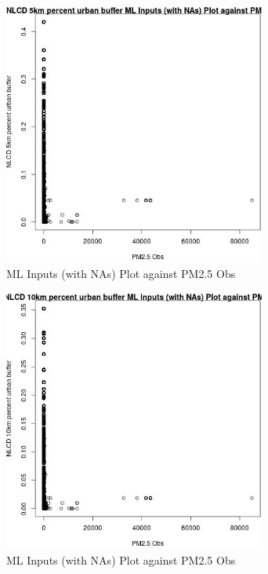 \begin{figure} 
\centering  
\includegraphics[width=0.77\textwidth]{Code_Outputs/Report_ML_input_PM25_Step4_part_f_de_duplicated_aves_prioritize_24hr_obswNAs_NLCD_5km_percent_urban_buffervPM25_Obs.jpg} 
\caption{\label{fig:Report_ML_input_PM25_Step4_part_f_de_duplicated_aves_prioritize_24hr_obswNAsNLCD_5km_percent_urban_buffervPM25_Obs}ML Inputs (with NAs) Plot against PM2.5 Obs} 
\end{figure} 
 

\clearpage 

\begin{figure} 
\centering  
\includegraphics[width=0.77\textwidth]{Code_Outputs/Report_ML_input_PM25_Step4_part_f_de_duplicated_aves_prioritize_24hr_obswNAs_NLCD_10km_percent_urban_buffervPM25_Obs.jpg} 
\caption{\label{fig:Report_ML_input_PM25_Step4_part_f_de_duplicated_aves_prioritize_24hr_obswNAsNLCD_10km_percent_urban_buffervPM25_Obs}ML Inputs (with NAs) Plot against PM2.5 Obs} 
\end{figure} 
 

